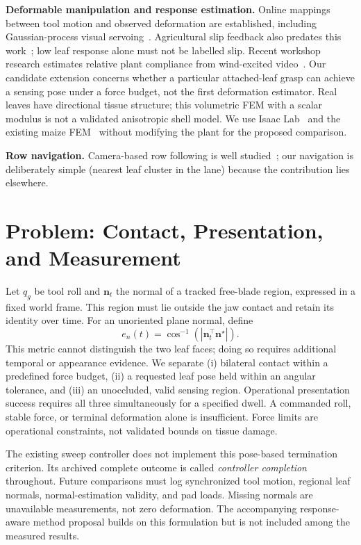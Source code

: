\documentclass[letterpaper, 10 pt, conference]{ieeeconf}
\begin{document}
\textbf{Deformable manipulation and response estimation.} Online mappings between tool
motion and observed deformation are established, including Gaussian-process visual
servoing~\cite{hu2017}. Agricultural slip feedback also predates this
work~\cite{zhou2022}; low leaf response alone must not be labelled slip. Recent workshop
research estimates relative plant compliance from wind-excited video~\cite{bhowmik2026}.
Our candidate extension concerns whether a particular attached-leaf grasp can achieve a
sensing pose under a force budget, not the first deformation estimator. Real leaves have
directional tissue structure; this volumetric FEM with a scalar modulus is not a validated
anisotropic shell model. We use Isaac Lab~\cite{mittal2023} and the existing maize
FEM~\cite{plantrepo,physx} without modifying the plant for the proposed comparison.

\textbf{Row navigation.} Camera-based row following is well studied~\cite{bakker2011}; our
navigation is deliberately simple (nearest leaf cluster in the lane) because the
contribution lies elsewhere.

\section{Problem: Contact, Presentation, and Measurement}
Let $q_g$ be tool roll and $\mathbf n_t$ the normal of a tracked free-blade region,
expressed in a fixed world frame. This region must lie outside the jaw contact and retain
its identity over time. For an unoriented plane normal, define
\begin{equation}
 e_n(t)=\cos^{-1}\!\left(\left|\mathbf n_t^\top\mathbf n^\star\right|\right).
\end{equation}
This metric cannot distinguish the two leaf faces; doing so requires additional temporal
or appearance evidence. We separate (i) bilateral contact within a predefined force
budget, (ii) a requested leaf pose held within an angular tolerance, and (iii) an
unoccluded, valid sensing region. Operational presentation success requires all three
simultaneously for a specified dwell. A commanded roll, stable force, or terminal
deformation alone is insufficient. Force limits are operational constraints, not
validated bounds on tissue damage.

The existing sweep controller does not implement this pose-based termination criterion.
Its archived complete outcome is called \emph{controller completion} throughout.
Future comparisons must log synchronized tool motion, regional leaf normals,
normal-estimation validity, and pad loads. Missing normals are unavailable measurements,
not zero deformation. The accompanying response-aware method proposal builds on this
formulation but is not included among the measured results.
\end{document}
